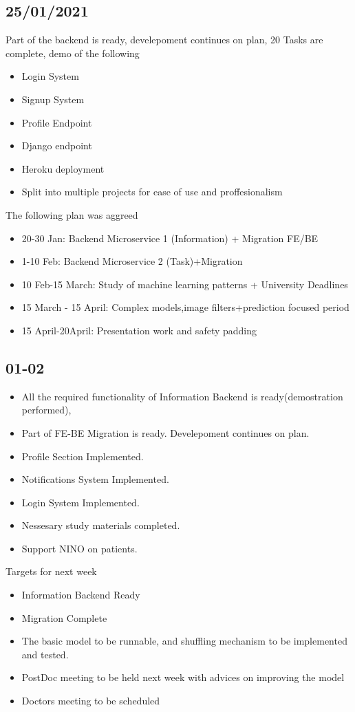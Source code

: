 \documentclass[a4paper,11pt,oneside]{book}
\begin{document}
	\subsection{25/01/2021}
	Part of the backend is ready, develepoment continues on plan, 20 Tasks are complete, demo of the following
	\begin{itemize}
		\item Login System
		\item Signup System
		\item Profile Endpoint
		\item Django endpoint
		\item Heroku deployment
		\item Split into multiple projects for ease of use and proffesionalism
	\end{itemize}
	The following plan was aggreed
	\begin{itemize}
		\item 20-30 Jan: 				Backend Microservice 1 (Information) + Migration FE/BE
		\item 1-10 Feb:  				Backend Microservice 2 (Task)+Migration
		\item 10 Feb-15 March: 		    Study of machine learning patterns + University Deadlines
		\item 15 March - 15 April:      Complex models,image filters+prediction focused period
		\item 15 April-20April:         Presentation work and safety padding
	\end{itemize}
	\subsection{01-02}
	\begin{itemize}
		\item All the required functionality of Information Backend is ready(demostration performed),
		\item Part of FE-BE Migration is ready. Develepoment continues on plan.
		\item Profile Section Implemented.
		\item Notifications System Implemented.
		\item Login System Implemented.
		\item Nessesary study materials completed.
		\item Support NINO on patients.
	\end{itemize}
	Targets for next week
	\begin{itemize}
		\item Information Backend Ready
		\item Migration Complete
		\item The basic model to be runnable, and shuffling mechanism to be implemented and tested. 
		\item PostDoc meeting to be held next week with advices on improving the model
		\item Doctors meeting to be scheduled
	\end{itemize}
\end{document}
